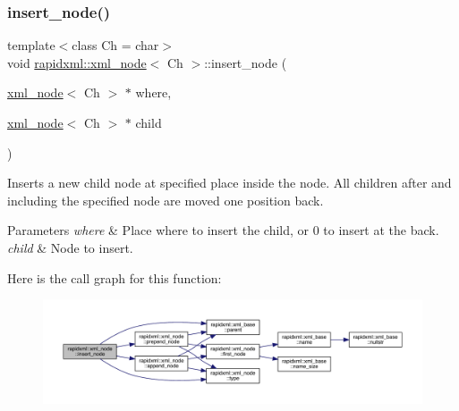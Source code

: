 \subsubsection{\texorpdfstring{insert\_node()}{insert\_node()}}
{\footnotesize\ttfamily template$<$class Ch = char$>$ \\
void \mbox{\hyperlink{classrapidxml_1_1xml__node}{rapidxml\+::xml\+\_\+node}}$<$ Ch $>$\+::insert\+\_\+node (\begin{DoxyParamCaption}\item[{\mbox{\hyperlink{classrapidxml_1_1xml__node}{xml\+\_\+node}}$<$ Ch $>$ $\ast$}]{where,  }\item[{\mbox{\hyperlink{classrapidxml_1_1xml__node}{xml\+\_\+node}}$<$ Ch $>$ $\ast$}]{child }\end{DoxyParamCaption})\hspace{0.3cm}{\ttfamily [inline]}}

Inserts a new child node at specified place inside the node. All children after and including the specified node are moved one position back.
\begin{DoxyParams}{Parameters}
{\em where} & Place where to insert the child, or 0 to insert at the back.\\
\hline
{\em child} & Node to insert. \\
\hline
\end{DoxyParams}
Here is the call graph for this function\+:\nopagebreak
\begin{figure}[H]
\begin{center}
\leavevmode
\includegraphics[width=350pt]{classrapidxml_1_1xml__node_a666880f42a7e486d78cc45ed51c7c46d_cgraph}
\end{center}
\end{figure}
\mbox{\label{classrapidxml_1_1xml__node_a67db03d1568dc6891573210ddba61520}} 
